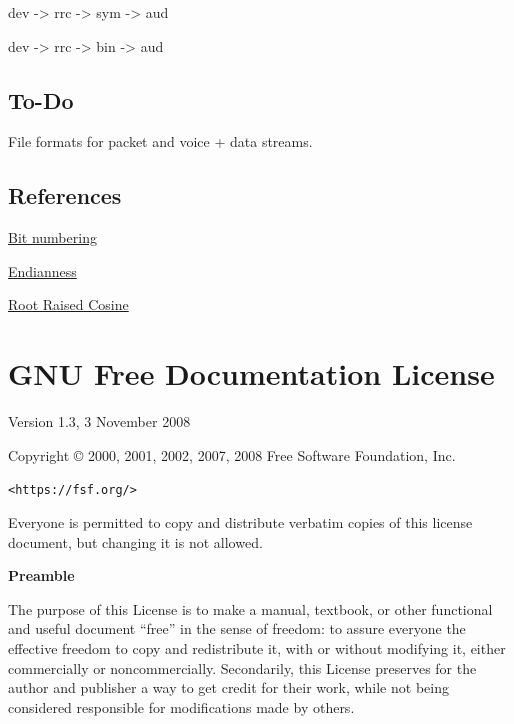 \documentclass[a4paper,11pt]{book}
\begin{document}
dev -\textgreater{} rrc -\textgreater{} sym -\textgreater{} aud

dev -\textgreater{} rrc -\textgreater{} bin -\textgreater{} aud

\section{To-Do}

File formats for packet and voice + data streams. 


\section{References}

\href{https://en.wikipedia.org/wiki/Bit_numbering}{Bit numbering}

\href{https://en.wikipedia.org/wiki/Endianness}{Endianness}

\href{https://en.wikipedia.org/wiki/Root-raised-cosine_filter}{Root
Raised Cosine}

\chapter{GNU Free Documentation License}

\begin{center}
	
	Version 1.3, 3 November 2008
	
	
	Copyright \copyright{} 2000, 2001, 2002, 2007, 2008  Free Software Foundation, Inc.
	
	\bigskip
	
	\texttt{<https://fsf.org/>}
	
	\bigskip
	
	Everyone is permitted to copy and distribute verbatim copies
	of this license document, but changing it is not allowed.
\end{center}


\begin{center}
	{\bf\large Preamble}
\end{center}

The purpose of this License is to make a manual, textbook, or other
functional and useful document ``free'' in the sense of freedom: to
assure everyone the effective freedom to copy and redistribute it,
with or without modifying it, either commercially or noncommercially.
Secondarily, this License preserves for the author and publisher a way
to get credit for their work, while not being considered responsible
for modifications made by others.
\end{document}
